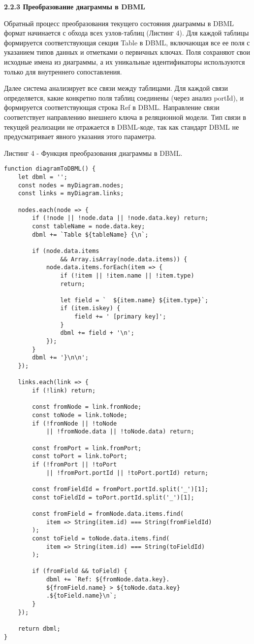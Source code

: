 \textbf{2.2.3 Преобразование диаграммы в DBML}

Обратный процесс преобразования текущего состояния диаграммы в DBML формат начинается с обхода всех узлов-таблиц (Листинг 4). Для каждой таблицы формируется соответствующая секция Table в DBML, включающая все ее поля с указанием типов данных и отметками о первичных ключах. Поля сохраняют свои исходные имена из диаграммы, а их уникальные идентификаторы используются только для внутреннего сопоставления.

Далее система анализирует все связи между таблицами. Для каждой связи определяется, какие конкретно поля таблиц соединены (через анализ portId), и формируется соответствующая строка Ref в DBML. Направление связи соответствует направлению внешнего ключа в реляционной модели. Тип связи в текущей реализации не отражается в DBML-коде, так как стандарт DBML не предусматривает явного указания этого параметра.

Листинг 4 - Функция преобразования диаграммы в DBML.
\begin{lstlisting}[frame=single]
function diagramToDBML() {
    let dbml = '';
    const nodes = myDiagram.nodes;
    const links = myDiagram.links;

    nodes.each(node => {
        if (!node || !node.data || !node.data.key) return;
        const tableName = node.data.key;
        dbml += `Table ${tableName} {\n`;

        if (node.data.items
                && Array.isArray(node.data.items)) {
            node.data.items.forEach(item => {
                if (!item || !item.name || !item.type) 
                return;

                let field = `  ${item.name} ${item.type}`;
                if (item.iskey) {
                    field += ' [primary key]';
                }
                dbml += field + '\n';
            });
        }
        dbml += '}\n\n';
    });

    links.each(link => {
        if (!link) return;

        const fromNode = link.fromNode;
        const toNode = link.toNode;
        if (!fromNode || !toNode 
            || !fromNode.data || !toNode.data) return;

        const fromPort = link.fromPort;
        const toPort = link.toPort;
        if (!fromPort || !toPort 
            || !fromPort.portId || !toPort.portId) return;

        const fromFieldId = fromPort.portId.split('_')[1];
        const toFieldId = toPort.portId.split('_')[1];

        const fromField = fromNode.data.items.find(
            item => String(item.id) === String(fromFieldId)
        );
        const toField = toNode.data.items.find(
            item => String(item.id) === String(toFieldId)
        );

        if (fromField && toField) {
            dbml += `Ref: ${fromNode.data.key}.
            ${fromField.name} > ${toNode.data.key}
            .${toField.name}\n`;
        }
    });

    return dbml;
}
\end{lstlisting}

